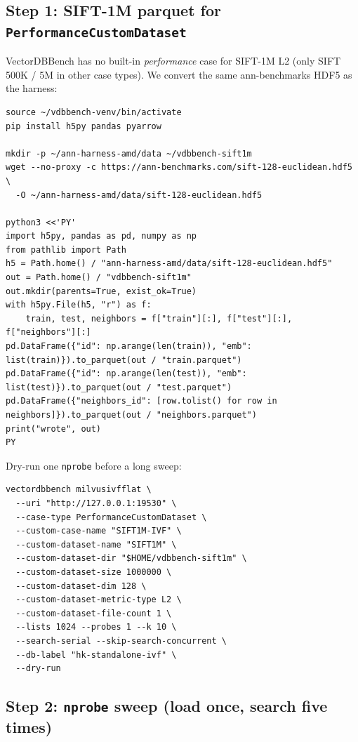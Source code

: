 \documentclass[11pt,a4paper]{article}
\begin{document}
\subsection{Step 1: SIFT-1M parquet for \texttt{PerformanceCustomDataset}}

VectorDBBench has no built-in \emph{performance} case for SIFT-1M L2 (only SIFT 500K / 5M in
other case types). We convert the same ann-benchmarks HDF5 as the harness:

\begin{verbatim}
source ~/vdbbench-venv/bin/activate
pip install h5py pandas pyarrow

mkdir -p ~/ann-harness-amd/data ~/vdbbench-sift1m
wget --no-proxy -c https://ann-benchmarks.com/sift-128-euclidean.hdf5 \
  -O ~/ann-harness-amd/data/sift-128-euclidean.hdf5

python3 <<'PY'
import h5py, pandas as pd, numpy as np
from pathlib import Path
h5 = Path.home() / "ann-harness-amd/data/sift-128-euclidean.hdf5"
out = Path.home() / "vdbbench-sift1m"
out.mkdir(parents=True, exist_ok=True)
with h5py.File(h5, "r") as f:
    train, test, neighbors = f["train"][:], f["test"][:], f["neighbors"][:]
pd.DataFrame({"id": np.arange(len(train)), "emb": list(train)}).to_parquet(out / "train.parquet")
pd.DataFrame({"id": np.arange(len(test)), "emb": list(test)}).to_parquet(out / "test.parquet")
pd.DataFrame({"neighbors_id": [row.tolist() for row in neighbors]}).to_parquet(out / "neighbors.parquet")
print("wrote", out)
PY
\end{verbatim}

Dry-run one \texttt{nprobe} before a long sweep:

\begin{verbatim}
vectordbbench milvusivfflat \
  --uri "http://127.0.0.1:19530" \
  --case-type PerformanceCustomDataset \
  --custom-case-name "SIFT1M-IVF" \
  --custom-dataset-name "SIFT1M" \
  --custom-dataset-dir "$HOME/vdbbench-sift1m" \
  --custom-dataset-size 1000000 \
  --custom-dataset-dim 128 \
  --custom-dataset-metric-type L2 \
  --custom-dataset-file-count 1 \
  --lists 1024 --probes 1 --k 10 \
  --search-serial --skip-search-concurrent \
  --db-label "hk-standalone-ivf" \
  --dry-run
\end{verbatim}

\subsection{Step 2: \texttt{nprobe} sweep (load once, search five times)}
\end{document}
